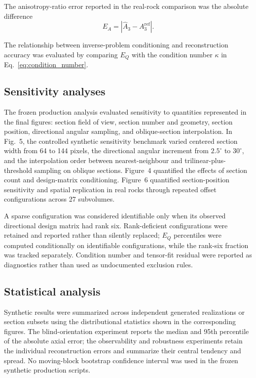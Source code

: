 \documentclass{article}
\begin{document}
The anisotropy-ratio error reported in the real-rock comparison was the
absolute difference
\begin{equation}
    E_{A}
    =
    \left|
        \widehat{A}_{3}-A_{3}^{\mathrm{ref}}
    \right|.
    \label{eq:anisotropy_error}
\end{equation}

The relationship between inverse-problem conditioning and reconstruction
accuracy was evaluated by comparing $E_{Q}$ with the condition number
$\kappa$ in Eq.~\eqref{eq:condition_number}.

\subsection{Sensitivity analyses}
\label{subsec:sensitivity}

The frozen production analysis evaluated sensitivity to quantities represented
in the final figures: section field of view, section number and geometry,
section position, directional angular sampling, and oblique-section
interpolation. In Fig.~5, the controlled synthetic sensitivity benchmark
varied centered section width from 64 to 144 pixels, the directional angular
increment from $2.5^{\circ}$ to $30^{\circ}$, and the interpolation order
between nearest-neighbour and trilinear-plus-threshold sampling on oblique
sections. Figure~4 quantified the effects of section count and design-matrix
conditioning. Figure~6 quantified section-position sensitivity and spatial
replication in real rocks through repeated offset configurations across 27
subvolumes.

A sparse configuration was considered identifiable only when its observed
directional design matrix had rank six. Rank-deficient configurations were
retained and reported rather than silently replaced; $E_Q$ percentiles were
computed conditionally on identifiable configurations, while the rank-six
fraction was tracked separately. Condition number and tensor-fit residual were
reported as diagnostics rather than used as undocumented exclusion rules.

\subsection{Statistical analysis}
\label{subsec:statistics}

Synthetic results were summarized across independent generated realizations or
section subsets using the distributional statistics shown in the corresponding
figures. The blind-orientation experiment reports the median and 95th
percentile of the absolute axial error; the observability and robustness
experiments retain the individual reconstruction errors and summarize their
central tendency and spread. No moving-block bootstrap confidence interval was
used in the frozen synthetic production scripts.
\end{document}
